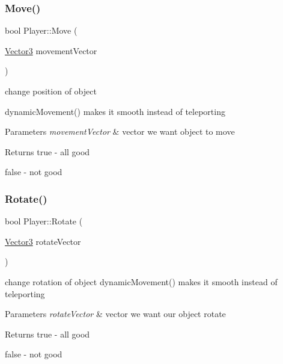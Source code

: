 \subsubsection{\texorpdfstring{Move()}{Move()}}
{\footnotesize\ttfamily bool Player\+::\+Move (\begin{DoxyParamCaption}\item[{\hyperlink{class_vector}{Vector3}}]{movement\+Vector }\end{DoxyParamCaption})}



change position of object 

dynamic\+Movement() makes it smooth instead of teleporting 
\begin{DoxyParams}{Parameters}
{\em movement\+Vector} & vector we want object to move \\
\hline
\end{DoxyParams}
\begin{DoxyReturn}{Returns}
true -\/ all good 

false -\/ not good 
\end{DoxyReturn}
\mbox{\label{class_player_a8f9cb8556ae0bd45732c6f552e336c68}} 
\subsubsection{\texorpdfstring{Rotate()}{Rotate()}}
{\footnotesize\ttfamily bool Player\+::\+Rotate (\begin{DoxyParamCaption}\item[{\hyperlink{class_vector}{Vector3}}]{rotate\+Vector }\end{DoxyParamCaption})}



change rotation of object dynamic\+Movement() makes it smooth instead of teleporting 


\begin{DoxyParams}{Parameters}
{\em rotate\+Vector} & vector we want our object rotate \\
\hline
\end{DoxyParams}
\begin{DoxyReturn}{Returns}
true -\/ all good 

false -\/ not good 
\end{DoxyReturn}
\mbox{\label{class_player_a797198656a642b66fd8ec656153d8595}} 
